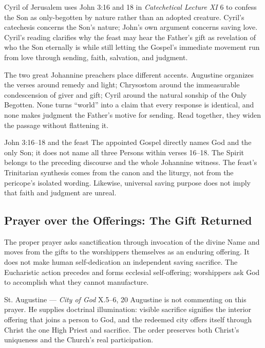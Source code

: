 Cyril of Jerusalem uses John 3:16 and 18 in \emph{Catechetical Lecture XI} 6 to confess the Son as only-begotten by nature rather than an adopted creature. Cyril's catechesis concerns the Son's nature; John's own argument concerns saving love. Cyril's reading clarifies why the feast may hear the Father's gift as revelation of who the Son eternally is while still letting the Gospel's immediate movement run from love through sending, faith, salvation, and judgment.

The two great Johannine preachers place different accents. Augustine organizes the verses around remedy and light; Chrysostom around the immeasurable condescension of giver and gift; Cyril around the natural sonship of the Only Begotten. None turns “world” into a claim that every response is identical, and none makes judgment the Father's motive for sending. Read together, they widen the passage without flattening it.

\begin{studybox}{John 3:16--18 and the feast}
The appointed Gospel directly names God and the only Son; it does not name all three Persons within verses 16--18. The Spirit belongs to the preceding discourse and the whole Johannine witness. The feast's Trinitarian synthesis comes from the canon and the liturgy, not from the pericope's isolated wording. Likewise, universal saving purpose does not imply that faith and judgment are unreal.
\end{studybox}

\subsection*{Prayer over the Offerings: The Gift Returned\enspace{}}

The proper prayer asks sanctification through invocation of the divine Name and moves from the gifts to the worshippers themselves as an enduring offering. It does not make human self-dedication an independent saving sacrifice. The Eucharistic action precedes and forms ecclesial self-offering; worshippers ask God to accomplish what they cannot manufacture.

\begin{sourcecard}{St. Augustine --- \emph{City of God} X.5--6, 20}
Augustine is not commenting on this prayer. He supplies doctrinal illumination: visible sacrifice signifies the interior offering that joins a person to God, and the redeemed city offers itself through Christ the one High Priest and sacrifice. The order preserves both Christ's uniqueness and the Church's real participation.
\end{sourcecard}

